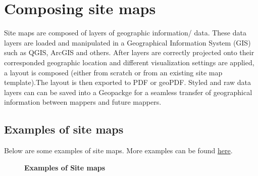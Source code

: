 \documentclass[
  a4paper,
  onecolumn,
  oneside]{book}
\begin{document}
\hypertarget{composing-site-maps}{%
\chapter{Composing site maps}\label{composing-site-maps}}

Site maps are composed of layers of geographic information/ data. These
data layers are loaded and manipulated in a Geographical Information
System (GIS) such as QGIS, ArcGIS and others. After layers are correctly
projected onto their corresponded geographic location and different
visualization settings are applied, a layout is composed (either from
scratch or from an existing site map template).The layout is then
exported to PDF or geoPDF. Styled and raw data layers can can be saved
into a Geopackge for a seamless transfer of geographical information
between mappers and future mappers.

\hypertarget{examples-of-site-maps}{%
\section{Examples of site maps}\label{examples-of-site-maps}}

Below are some examples of site maps. More examples can be found
\href{add\%20link}{here}.

\begin{figure}

\begin{minipage}[t]{0.50\linewidth}

{\centering 


}

\end{minipage}%
%
\begin{minipage}[t]{0.50\linewidth}

{\centering 


}

\end{minipage}%

\caption{\label{fig-examples}\textbf{Examples of Site maps}}

\end{figure}
\end{document}

